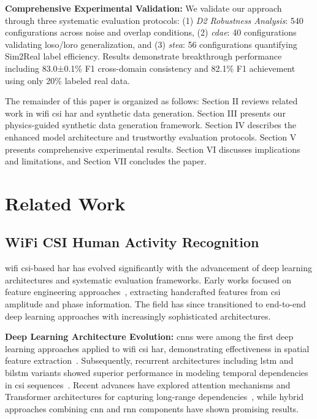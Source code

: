 \documentclass[journal]{IEEEtran}
\begin{document}
\textbf{Comprehensive Experimental Validation:} We validate our approach through three systematic evaluation protocols: (1) \textit{D2 Robustness Analysis}: 540 configurations across noise and overlap conditions, (2) \textit{\gls{cdae}}: 40 configurations validating \gls{loso}/\gls{loro} generalization, and (3) \textit{\gls{stea}}: 56 configurations quantifying Sim2Real label efficiency. Results demonstrate breakthrough performance including 83.0±0.1\% F1 cross-domain consistency and 82.1\% F1 achievement using only 20\% labeled real data.

The remainder of this paper is organized as follows: Section II reviews related work in \gls{wifi} \gls{csi} \gls{har} and synthetic data generation. Section III presents our physics-guided synthetic data generation framework. Section IV describes the enhanced model architecture and trustworthy evaluation protocols. Section V presents comprehensive experimental results. Section VI discusses implications and limitations, and Section VII concludes the paper.

\section{Related Work}

\subsection{WiFi CSI Human Activity Recognition}

\gls{wifi} \gls{csi}-based \gls{har} has evolved significantly with the advancement of deep learning architectures and systematic evaluation frameworks. Early works focused on feature engineering approaches~\cite{csi_basics2016}, extracting handcrafted features from \gls{csi} amplitude and phase information. The field has since transitioned to end-to-end deep learning approaches with increasingly sophisticated architectures.

\textbf{Deep Learning Architecture Evolution:} \glspl{cnn} were among the first deep learning approaches applied to \gls{wifi} \gls{csi} \gls{har}, demonstrating effectiveness in spatial feature extraction~\cite{clnet2021}. Subsequently, recurrent architectures including \gls{lstm} and \gls{bilstm} variants showed superior performance in modeling temporal dependencies in \gls{csi} sequences~\cite{rewis2022}. Recent advances have explored attention mechanisms and Transformer architectures for capturing long-range dependencies~\cite{autofi2022}, while hybrid approaches combining \gls{cnn} and \gls{rnn} components have shown promising results.
\end{document}
